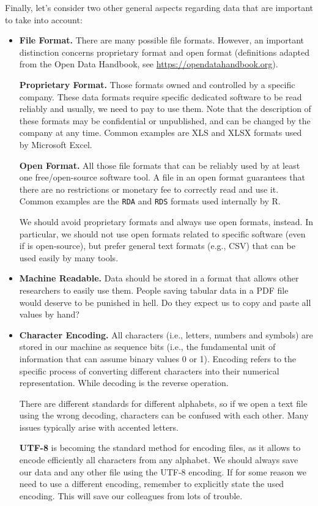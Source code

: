 \documentclass[
  11pt,
]{book}
\begin{document}
Finally, let's consider two other general aspects regarding data that are important to take into account:

\begin{itemize}
\item
  \textbf{File Format.} There are many possible file formats. However, an important distinction concerns proprietary format and open format (definitions adapted from the Open Data Handbook, see \url{https://opendatahandbook.org}).

  \textbf{Proprietary Format.} Those formats owned and controlled by a specific company. These data formats require specific dedicated software to be read reliably and usually, we need to pay to use them. Note that the description of these formats may be confidential or unpublished, and can be changed by the company at any time. Common examples are XLS and XLSX formats used by Microsoft Excel.

  \textbf{Open Format.} All those file formats that can be reliably used by at least one free/open-source software tool. A file in an open format guarantees that there are no restrictions or monetary fee to correctly read and use it. Common examples are the \texttt{RDA} and \texttt{RDS} formats used internally by R.

  We should avoid proprietary formats and always use open formats, instead. In particular, we should not use open formats related to specific software (even if is open-source), but prefer general text formats (e.g., CSV) that can be used easily by many tools.
\item
  \textbf{Machine Readable.} Data should be stored in a format that allows other researchers to easily use them. People saving tabular data in a PDF file would deserve to be punished in hell. Do they expect us to copy and paste all values by hand?
\item
  \textbf{Character Encoding.} All characters (i.e., letters, numbers and symbols) are stored in our machine as sequence bits (i.e., the fundamental unit of information that can assume binary values 0 or 1). Encoding refers to the specific process of converting different characters into their numerical representation. While decoding is the reverse operation.

  There are different standards for different alphabets, so if we open a text file using the wrong decoding, characters can be confused with each other. Many issues typically arise with accented letters.

  \textbf{UTF-8} is becoming the standard method for encoding files, as it allows to encode efficiently all characters from any alphabet. We should always save our data and any other file using the UTF-8 encoding. If for some reason we need to use a different encoding, remember to explicitly state the used encoding. This will save our colleagues from lots of trouble.


\end{itemize}
\end{document}
